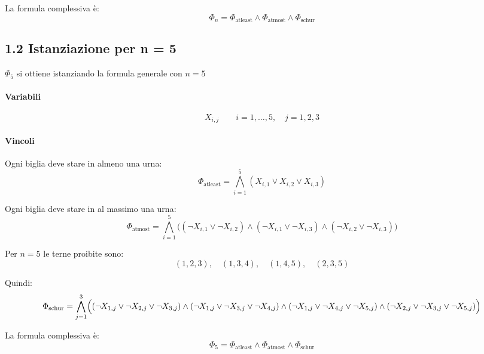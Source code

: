 \documentclass[a4paper,11pt]{article}
\begin{document}
La formula complessiva è:
\[
\Phi_n
=
\Phi_{\mathrm{atleast}}
\land
\Phi_{\mathrm{atmost}}
\land
\Phi_{\mathrm{schur}}
\]

\newpage

\subsection*{1.2 Istanziazione per n = 5}
$\Phi_5$ si ottiene istanziando la formula generale con $n=5$

\paragraph{Variabili}

\[
X_{i,j}
\qquad
i=1,\dots,5,
\quad
j=1,2,3
\]

\paragraph{Vincoli}

Ogni biglia deve stare in almeno una urna:
\[
\Phi_{\mathrm{atleast}}
=
\bigwedge_{i=1}^5
(X_{i,1}\lor X_{i,2}\lor X_{i,3})
\]

Ogni biglia deve stare in al massimo una urna:
\[
\Phi_{\mathrm{atmost}}
=
\bigwedge_{i=1}^5
\bigl(
(\lnot X_{i,1}\lor \lnot X_{i,2})
\land
(\lnot X_{i,1}\lor \lnot X_{i,3})
\land
(\lnot X_{i,2}\lor \lnot X_{i,3})
\bigr)
\]


Per $n=5$ le terne proibite sono:
\[
(1,2,3),\quad (1,3,4),\quad (1,4,5),\quad (2,3,5)
\]

Quindi:
\[
\Phi_{\mathrm{schur}}
=
\bigwedge_{j=1}^{3}
\Bigl(
(\lnot X_{1,j}\lor \lnot X_{2,j}\lor \lnot X_{3,j})
\land
(\lnot X_{1,j}\lor \lnot X_{3,j}\lor \lnot X_{4,j})
\land
(\lnot X_{1,j}\lor \lnot X_{4,j}\lor \lnot X_{5,j})
\land
(\lnot X_{2,j}\lor \lnot X_{3,j}\lor \lnot X_{5,j})
\Bigr)
\]

La formula complessiva è:
\[
\Phi_5
=
\Phi_{\mathrm{atleast}}
\land
\Phi_{\mathrm{atmost}}
\land
\Phi_{\mathrm{schur}}
\]
\end{document}
